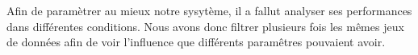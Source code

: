 Afin de paramètrer au mieux notre sysytème,
il a fallut analyser ses performances dans différentes conditions.
Nous avons donc filtrer plusieurs fois les mêmes jeux de données afin de voir
l'influence que différents paramêtres pouvaient avoir.
